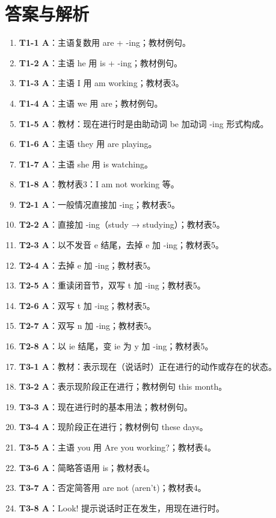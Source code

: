 \documentclass[11pt,a4paper]{ctexart}
\begin{document}
\section*{答案与解析}
\small
\begin{enumerate}[leftmargin=1.6em,itemsep=2pt]
\item \textbf{T1-1 A}：主语复数用 are + -ing；教材例句。
\item \textbf{T1-2 A}：主语 he 用 is + -ing；教材例句。
\item \textbf{T1-3 A}：主语 I 用 am working；教材表3。
\item \textbf{T1-4 A}：主语 we 用 are；教材例句。
\item \textbf{T1-5 A}：教材：现在进行时是由助动词 be 加动词 -ing 形式构成。
\item \textbf{T1-6 A}：主语 they 用 are playing。
\item \textbf{T1-7 A}：主语 she 用 is watching。
\item \textbf{T1-8 A}：教材表3：I am not working 等。
\item \textbf{T2-1 A}：一般情况直接加 -ing；教材表5。
\item \textbf{T2-2 A}：直接加 -ing（study → studying）；教材表5。
\item \textbf{T2-3 A}：以不发音 e 结尾，去掉 e 加 -ing；教材表5。
\item \textbf{T2-4 A}：去掉 e 加 -ing；教材表5。
\item \textbf{T2-5 A}：重读闭音节，双写 t 加 -ing；教材表5。
\item \textbf{T2-6 A}：双写 t 加 -ing；教材表5。
\item \textbf{T2-7 A}：双写 n 加 -ing；教材表5。
\item \textbf{T2-8 A}：以 ie 结尾，变 ie 为 y 加 -ing；教材表5。
\item \textbf{T3-1 A}：教材：表示现在（说话时）正在进行的动作或存在的状态。
\item \textbf{T3-2 A}：表示现阶段正在进行；教材例句 this month。
\item \textbf{T3-3 A}：现在进行时的基本用法；教材例句。
\item \textbf{T3-4 A}：现阶段正在进行；教材例句 these days。
\item \textbf{T3-5 A}：主语 you 用 Are you working?；教材表4。
\item \textbf{T3-6 A}：简略答语用 is；教材表4。
\item \textbf{T3-7 A}：否定简答用 are not (aren’t)；教材表4。
\item \textbf{T3-8 A}：Look! 提示说话时正在发生，用现在进行时。

\end{enumerate}
\end{document}
